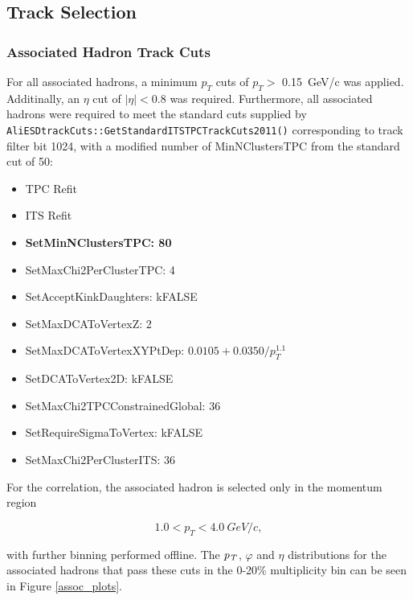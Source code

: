 \documentclass[ALICE,manyauthors]{ALICE_analysis_notes}
\begin{document}
\subsection{Track Selection}

\subsubsection{Associated Hadron Track Cuts}
\label{assoccuts}
For all associated hadrons, a minimum $p_{T}$ cuts of $p_{T} >$ \SI{0.15}{GeV/c} was applied.  Additinally, an $\eta$ cut of $|{\eta}| < 0.8$ was required. Furthermore, all associated hadrons were required to meet the standard cuts supplied by \texttt{AliESDtrackCuts::GetStandardITSTPCTrackCuts2011()} corresponding to track filter bit 1024, with a modified number of MinNClustersTPC from the standard cut of 50:

\begin{itemize}
    \item TPC Refit
    \item ITS Refit
	\item \textbf{SetMinNClustersTPC: 80}
	\item SetMaxChi2PerClusterTPC: 4
	\item SetAcceptKinkDaughters: kFALSE
	\item SetMaxDCAToVertexZ: 2
	\item SetMaxDCAToVertexXYPtDep: $0.0105+0.0350/p_{T}^{1.1}$
	\item SetDCAToVertex2D: kFALSE
	\item SetMaxChi2TPCConstrainedGlobal: 36
	\item SetRequireSigmaToVertex: kFALSE
	\item SetMaxChi2PerClusterITS: 36
\end{itemize}

For the correlation, the associated hadron is selected only in the momentum region

$${1.0 < p_{T} < \SI{4.0}{GeV/c}},$$ 

with further binning performed offline. The $\it{p}_{T}$, $\varphi$ and $\eta$ distributions for the associated hadrons that pass these cuts in the 0-20\% multiplicity bin can be seen in Figure \ref{assoc_plots}.
\end{document}
